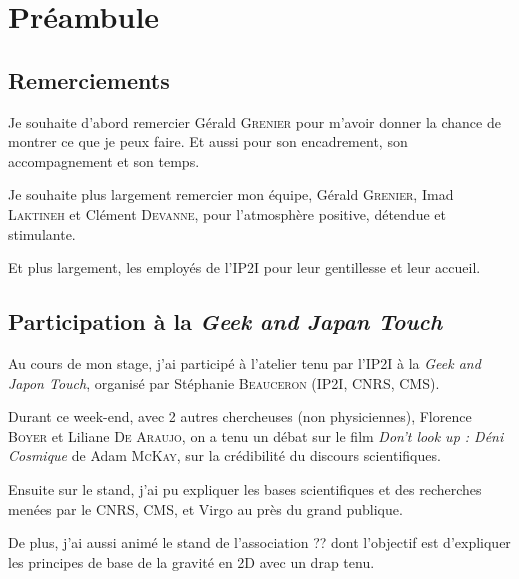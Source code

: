 
\chapter*{Préambule}

\section*{Remerciements}

Je souhaite d'abord remercier Gérald \textsc{Grenier} pour m'avoir donner la chance de montrer ce que je peux faire. Et aussi pour son encadrement, son accompagnement et son temps.

Je souhaite plus largement remercier mon équipe, Gérald \textsc{Grenier}, Imad \textsc{Laktineh} et Clément \textsc{Devanne}, pour l'atmosphère positive, détendue et stimulante.

Et plus largement, les employés de l'IP2I pour leur gentillesse et leur accueil.

\section*{Participation à la \textit{Geek and Japan Touch}}

Au cours de mon stage, j'ai participé à l'atelier tenu par l'IP2I à la \textit{Geek and Japon Touch}, organisé par Stéphanie \textsc{Beauceron} (IP2I, CNRS, CMS).

Durant ce week-end, avec 2 autres chercheuses (non physiciennes), Florence \textsc{Boyer} et Liliane \textsc{De Araujo}, on a tenu un débat sur le film \textit{Don't look up : Déni Cosmique} de Adam \textsc{McKay}, sur la crédibilité du discours scientifiques.

Ensuite sur le stand, j'ai pu expliquer les bases scientifiques et des recherches menées par le CNRS, CMS, et Virgo au près du grand publique. 

De plus, j'ai aussi animé le stand de l'association ?? dont l'objectif est d'expliquer les principes de base de la gravité en 2D avec un drap tenu.